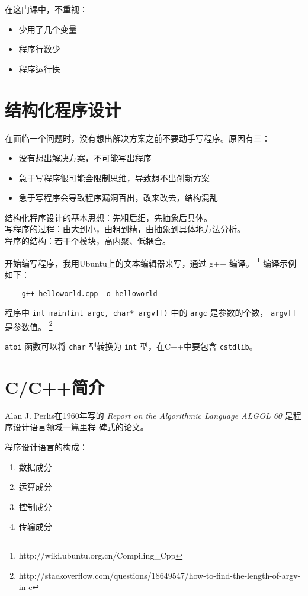 \documentclass[UTF8]{ctexart}
\begin{document}
在这门课中，不重视：
\begin{itemize}
    \item 少用了几个变量
    \item 程序行数少
    \item 程序运行快
\end{itemize}

\section{结构化程序设计}
在面临一个问题时，没有想出解决方案之前不要动手写程序。原因有三：
\begin{itemize}
    \item 没有想出解决方案，不可能写出程序
    \item 急于写程序很可能会限制思维，导致想不出创新方案
    \item 急于写程序会导致程序漏洞百出，改来改去，结构混乱
\end{itemize}

结构化程序设计的基本思想：先粗后细，先抽象后具体。\\
写程序的过程：由大到小，由粗到精，由抽象到具体地方法分析。\\
程序的结构：若干个模块，高内聚、低耦合。

开始编写程序，我用Ubuntu上的文本编辑器来写，通过 g++ 编译。
\footnote{http://wiki.ubuntu.org.cn/Compiling\_Cpp} 编译示例如下：
\begin{verbatim}
    g++ helloworld.cpp -o helloworld
\end{verbatim}

程序中 \texttt{int main(int argc, char* argv[])} 中的 \texttt{argc} 是参数的个数，
\texttt{argv[]} 是参数值。
\footnote{http://stackoverflow.com/questions/18649547/how-to-find-the-length-of-argv-in-c}

\texttt{atoi} 函数可以将 \texttt{char} 型转换为 \texttt{int} 型，在C++中要包含 \texttt{cstdlib}。

\section{C/C++简介}
Alan J. Perlis在1960年写的 \emph{Report on the Algorithmic Language ALGOL 60} 是程序设计语言领域一篇里程
碑式的论文。

程序设计语言的构成：
\begin{enumerate}
    \item 数据成分
    \item 运算成分
    \item 控制成分
    \item 传输成分
\end{enumerate}
\end{document}

